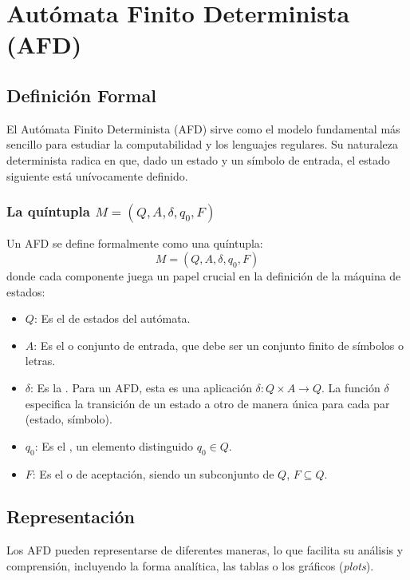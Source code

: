\section{Autómata Finito Determinista (AFD)} %

\subsection{Definición Formal} %
El Autómata Finito Determinista (AFD) sirve como el modelo fundamental más sencillo para estudiar la computabilidad y los lenguajes regulares. Su naturaleza determinista radica en que, dado un estado y un símbolo de entrada, el estado siguiente está unívocamente definido.

\subsubsection{La quíntupla $M=(Q,A,\delta,q_0,F)$}
Un AFD se define formalmente como una quíntupla:
\[ M = (Q, A, \delta, q_0, F) \]
donde cada componente juega un papel crucial en la definición de la máquina de estados:
\begin{itemize}
    \item $Q$: Es el  de estados del autómata.
    \item $A$: Es el  o conjunto de entrada, que debe ser un conjunto finito de símbolos o letras.
    \item $\delta$: Es la . Para un AFD, esta es una aplicación $\delta : Q \times A \to Q$. La función $\delta$ especifica la transición de un estado a otro de manera única para cada par (estado, símbolo).
    \item $q_0$: Es el , un elemento distinguido $q_0 \in Q$.
    \item $F$: Es el  o de aceptación, siendo un subconjunto de $Q$, $F \subseteq Q$.
\end{itemize}

\subsection{Representación} %

Los AFD pueden representarse de diferentes maneras, lo que facilita su análisis y comprensión, incluyendo la forma analítica, las tablas o los gráficos (\textit{plots}).

